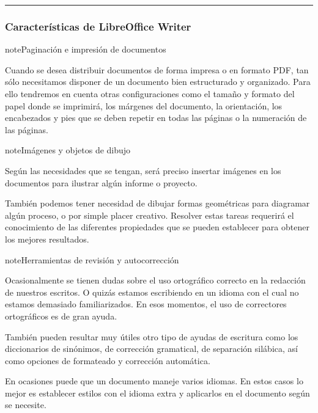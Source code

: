 \documentclass[letterpaper,10pt,spanish]{sphinxmanual}
\begin{document}
\bigskip\hrule\bigskip



\subsubsection{Características de LibreOffice Writer}
\label{\detokenize{1_guias/10ofimatica/G1013:caracteristicas-de-libreoffice-writer}}
\begin{sphinxadmonition}{note}{Paginación e impresión de documentos}

\sphinxAtStartPar
Cuando se desea distribuir documentos de forma impresa o en formato PDF, tan sólo necesitamos disponer de un documento bien estructurado y organizado. Para ello tendremos en cuenta otras configuraciones como el tamaño y formato del papel donde se imprimirá, los márgenes del documento, la orientación, los encabezados y pies que se deben repetir en todas las páginas o la numeración de las páginas.
\end{sphinxadmonition}

\begin{sphinxadmonition}{note}{Imágenes y objetos de dibujo}

\sphinxAtStartPar
Según las necesidades que se tengan, será preciso insertar imágenes en los documentos para ilustrar algún informe o proyecto.

\sphinxAtStartPar
También podemos tener necesidad de dibujar formas geométricas para diagramar algún proceso, o por simple placer creativo. Resolver estas tareas requerirá el conocimiento de las diferentes propiedades que se pueden establecer para obtener los mejores resultados.
\end{sphinxadmonition}

\begin{sphinxadmonition}{note}{Herramientas de revisión y autocorrección}

\sphinxAtStartPar
Ocasionalmente se tienen dudas sobre el uso ortográfico correcto en la redacción de nuestros escritos. O quizás estamos escribiendo en un idioma con el cual no estamos demasiado familiarizados. En esos momentos, el uso de correctores ortográficos es de gran ayuda.

\sphinxAtStartPar
También pueden resultar muy útiles otro tipo de ayudas de escritura como los diccionarios de sinónimos, de corrección gramatical, de separación silábica, así como opciones de formateado y corrección automática.

\sphinxAtStartPar
En ocasiones puede que un documento maneje varios idiomas. En estos casos lo mejor es establecer estilos con el idioma extra y aplicarlos en el documento según se necesite.
\end{sphinxadmonition}
\end{document}
